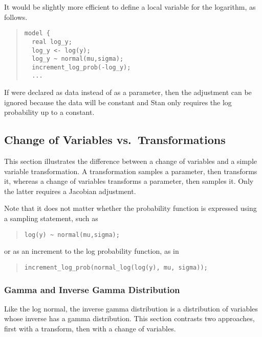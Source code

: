 It would be slightly more efficient to define a local variable for the
logarithm, as follows.
%
\begin{quote}
\begin{Verbatim}[fontsize=\small]
model {
  real log_y;
  log_y <- log(y);
  log_y ~ normal(mu,sigma);
  increment_log_prob(-log_y);
  ...
\end{Verbatim}
\end{quote}
%

If  were declared as data instead of as a parameter, then the
adjustment can be ignored because the data will be constant and Stan
only requires the log probability up to a constant.

\subsection{Change of Variables vs.\ Transformations}

This section illustrates the difference between a change of variables
and a simple variable transformation.  A transformation samples a
parameter, then transforms it, whereas a change of variables
transforms a parameter, then samples it.  Only the latter requires a
Jacobian adjustment.  

Note that it does not matter whether the probability function is
expressed using a sampling statement, such as
%
\begin{quote}
\begin{Verbatim}
log(y) ~ normal(mu,sigma);
\end{Verbatim}
\end{quote}
%
or as an increment to the log probability function, as in
%
\begin{quote}
\begin{Verbatim}
increment_log_prob(normal_log(log(y), mu, sigma));
\end{Verbatim}
\end{quote}

\subsubsection{Gamma and Inverse Gamma Distribution}\label{jacobian-adjustment.section}

Like the log normal, the inverse gamma distribution is a distribution
of variables whose inverse has a gamma distribution.  This section
contrasts two approaches, first with a transform, then with a change
of variables. 

